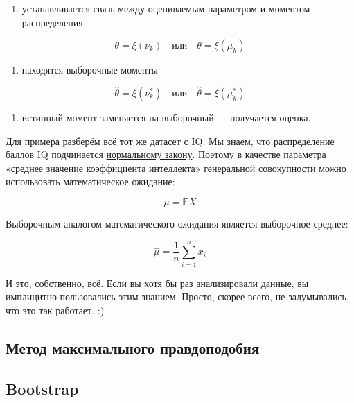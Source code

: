\documentclass[
  letterpaper,
  DIV=11,
  numbers=noendperiod]{scrreprt}
\providecommand{\tightlist}{%
  \setlength{\itemsep}{0pt}\setlength{\parskip}{0pt}}\usepackage{longtable,booktabs,array}
\theoremstyle{definition}
\theoremstyle{remark}
\begin{document}
\begin{enumerate}
\def\labelenumi{\arabic{enumi})}
\tightlist
\item
  устанавливается связь между оцениваемым параметром и моментом
  распределения
\end{enumerate}

\[
\theta = \xi(\nu_k) \quad \text{или} \quad \theta = \xi(\mu_k)
\]

\begin{enumerate}
\def\labelenumi{\arabic{enumi})}
\setcounter{enumi}{1}
\tightlist
\item
  находятся выборочные моменты
\end{enumerate}

\[
\hat \theta = \xi(\nu_k^*) \quad \text{или} \quad \hat \theta = \xi(\mu_k^*)
\]

\begin{enumerate}
\def\labelenumi{\arabic{enumi})}
\setcounter{enumi}{2}
\tightlist
\item
  истинный момент заменяется на выборочный --- получается оценка.
\end{enumerate}

Для примера разберём всё тот же датасет с IQ. Мы знаем, что
распределение баллов IQ подчинается
\hyperref[normal_distribution]{нормальному закону}. Поэтому в качестве
параметра «среднее значение коэффициента интеллекта» генеральной
совокупности можно использовать математическое ожидание:

\[
\mu = \mathbb{E}X
\]

Выборочным аналогом математического ожидания является выборочное
среднее:

\[
\hat \mu = \frac{1}{n} \sum_{i=1}^n x_i
\]

И это, собственно, всё. Если вы хотя бы раз анализировали данные, вы
имплицитно пользовались этим знанием. Просто, скорее всего, не
задумывались, что это так работает. :)

\subsection{Метод максимального
правдоподобия}\label{ux43cux435ux442ux43eux434-ux43cux430ux43aux441ux438ux43cux430ux43bux44cux43dux43eux433ux43e-ux43fux440ux430ux432ux434ux43eux43fux43eux434ux43eux431ux438ux44f}

\subsection{Bootstrap}\label{bootstrap}
\end{document}
